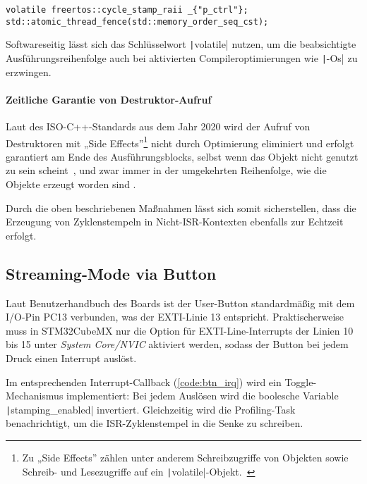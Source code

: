 \begin{code}
\begin{verbatim}
volatile freertos::cycle_stamp_raii _{"p_ctrl"};
std::atomic_thread_fence(std::memory_order_seq_cst);
\end{verbatim}
    \label{code:memory_barrier}
\end{code}

Softwareseitig lässt sich das Schlüsselwort \texttt|volatile| nutzen,
um die beabsichtigte Ausführungsreihenfolge auch bei aktivierten
Compileroptimierungen wie \texttt|-Os| zu erzwingen.

\paragraph{Zeitliche Garantie von Destruktor-Aufruf}

Laut des ISO-C++-Standards aus dem Jahr 2020 wird der Aufruf von Destruktoren
mit „Side Effects”\footnote{Zu „Side Effects” zählen unter anderem
Schreibzugriffe von Objekten sowie Schreib- und Lesezugriffe auf ein
\texttt|volatile|-Objekt.~\cite{cppreference_eval_order}} nicht durch
Optimierung eliminiert und erfolgt garantiert am Ende des Ausführungsblocks,
selbst wenn das Objekt nicht genutzt zu sein scheint~\cite[§6.7.5.4 Abs.
3]{iso_iec_14882_2020}, und zwar immer in der umgekehrten Reihenfolge, wie die
Objekte erzeugt worden sind \cite{isocpp_dtor_order}.

Durch die oben beschriebenen Maßnahmen lässt sich somit sicherstellen, dass die
Erzeugung von Zyklenstempeln in Nicht-ISR-Kontexten ebenfalls zur Echtzeit
erfolgt.

\subsection{Streaming-Mode via Button}

Laut Benutzerhandbuch des Boards ist der User-Button standardmäßig mit dem
I/O-Pin PC13 verbunden, was der \ac{EXTI}-Linie 13 entspricht. Praktischerweise
muss in STM32CubeMX nur die Option für EXTI-Line-Interrupts der Linien 10 bis 15
unter \textit{System Core/NVIC} aktiviert werden, sodass der Button bei jedem
Druck einen Interrupt auslöst.

Im entsprechenden Interrupt-Callback (\ref{code:btn_irq}) wird ein
Toggle-Mechanismus implementiert: Bei jedem Auslösen wird die boolesche Variable
\texttt|stamping_enabled| invertiert. Gleichzeitig wird die
Profiling-Task benachrichtigt, um die ISR-Zyklenstempel in die Senke zu
schreiben.

